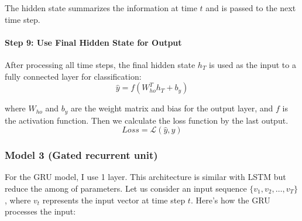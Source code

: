 \documentclass[12pt,a4paper]{article}
\begin{document}
The hidden state summarizes the information at time $t$ and is passed to the next time step.

\paragraph{Step 9: Use Final Hidden State for Output}
After processing all time steps, the final hidden state $h_T$ is used as the input to a fully connected layer for classification:
\begin{equation}
    \hat{y} = f(W_{ho}^T h_T + b_y)    
\end{equation}

where $W_{ho}$ and $b_y$ are the weight matrix and bias for the output layer, and $f$ is the activation function. Then we calculate the loss function by the last output.
\begin{equation}
    Loss = \mathcal{L}(\hat{y}, y)
\end{equation}


\subsubsection{Model 3 (Gated recurrent unit)}
For the GRU model, I use 1 layer. This architecture is similar with LSTM but reduce the among of parameters. Let us consider an input sequence $\{v_1, v_2, \dots, v_T\}$, where $v_t$ represents the input vector at time step $t$. Here's how the GRU processes the input:
\end{document}
